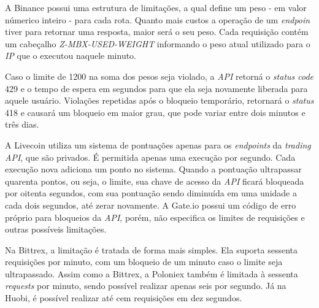 A Binance possui uma estrutura de limitações, a qual define um peso - em valor númerico inteiro - para cada rota. Quanto mais custos a operação de um \textit{endpoin} tiver para retornar uma resposta, maior será o seu peso. Cada requisição contém um cabeçalho \textit{Z-MBX-USED-WEIGHT} informando o peso atual utilizado para o \textit{IP} que o executou naquele minuto. 

Caso o limite de 1200 na soma dos pesos seja violado, a \textit{API} retorná o \textit{status code} 429 e o tempo de espera em segundos para que ela seja novamente liberada para aquele usuário. Violações repetidas após o bloqueio temporário, retornará o \textit{status} 418 e causará um bloqueio em maior grau, que pode variar entre dois minutos e três dias.

A Livecoin utiliza um sistema de pontuações apenas para os \textit{endpoints} da \textit{trading API}, que são privados. É permitida apenas uma execução por segundo. Cada execução nova adiciona um ponto no sistema. Quando a pontuação ultrapassar quarenta pontos, ou seja, o limite, sua chave de acesso da \textit{API} ficará bloqueada por oitenta segundos, com sua pontuação sendo diminuída em uma unidade a cada dois segundos, até zerar novamente. A Gate.io possui um código de erro próprio para bloqueios da \textit{API}, porém, não especifica os limites de requisições e outras possíveis limitações.

Na Bittrex, a limitação é tratada de forma mais simples. Ela suporta sessenta requisições por minuto, com um bloqueio de um minuto caso o limite seja ultrapassado. Assim como a Bittrex, a Poloniex também é limitada à sessenta \textit{requests} por minuto, sendo possível realizar apenas seis por segundo. Já na Huobi, é possível realizar até cem requisições em dez segundos.
